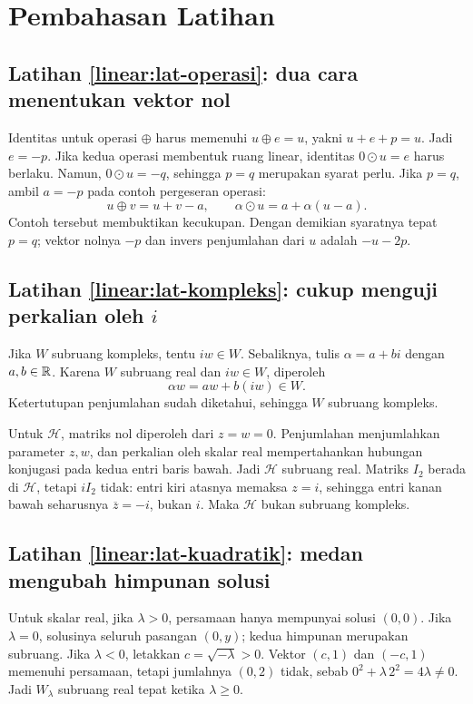\ifpembahasan
    \section{Pembahasan Latihan}
    \label{linear:pembahasan}

    \subsection*{Latihan \ref{linear:lat-operasi}: dua cara menentukan vektor nol}
    Identitas untuk operasi $\oplus$ harus memenuhi $u\oplus e=u$,
    yakni $u+e+p=u$. Jadi $e=-p$.
    Jika kedua operasi membentuk ruang linear, identitas $0\odot u=e$
    harus berlaku. Namun, $0\odot u=-q$, sehingga $p=q$ merupakan
    syarat perlu.
    Jika $p=q$, ambil $a=-p$ pada contoh pergeseran operasi:
    \[
        u\oplus v=u+v-a,\qquad
        \alpha\odot u=a+\alpha(u-a).
    \]
    Contoh tersebut membuktikan kecukupan. Dengan demikian syaratnya
    tepat $p=q$; vektor nolnya $-p$ dan invers penjumlahan dari $u$
    adalah $-u-2p$.

    \subsection*{Latihan \ref{linear:lat-kompleks}: cukup menguji perkalian oleh $i$}
    Jika $W$ subruang kompleks, tentu $iw\in W$.
    Sebaliknya, tulis $\alpha=a+bi$ dengan $a,b\in\mathbb{R}$.
    Karena $W$ subruang real dan $iw\in W$, diperoleh
    \[
        \alpha w=aw+b(iw)\in W.
    \]
    Ketertutupan penjumlahan sudah diketahui, sehingga $W$ subruang kompleks.

    Untuk $\mathcal H$, matriks nol diperoleh dari $z=w=0$.
    Penjumlahan menjumlahkan parameter $z,w$, dan perkalian oleh
    skalar real mempertahankan hubungan konjugasi pada kedua entri
    baris bawah. Jadi $\mathcal H$ subruang real.
    Matriks $I_2$ berada di $\mathcal H$, tetapi $iI_2$ tidak:
    entri kiri atasnya memaksa $z=i$, sehingga entri kanan bawah
    seharusnya $\overline z=-i$, bukan $i$.
    Maka $\mathcal H$ bukan subruang kompleks.

    \subsection*{Latihan \ref{linear:lat-kuadratik}: medan mengubah himpunan solusi}
    Untuk skalar real, jika $\lambda>0$, persamaan hanya mempunyai
    solusi $(0,0)$. Jika $\lambda=0$, solusinya seluruh pasangan
    $(0,y)$; kedua himpunan merupakan subruang.
    Jika $\lambda<0$, letakkan $c=\sqrt{-\lambda}>0$.
    Vektor $(c,1)$ dan $(-c,1)$ memenuhi persamaan, tetapi jumlahnya
    $(0,2)$ tidak, sebab $0^2+\lambda\,2^2=4\lambda\ne0$.
    Jadi $W_\lambda$ subruang real tepat ketika $\lambda\ge0$.

